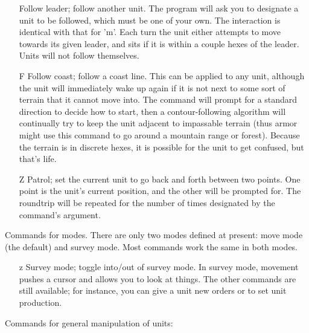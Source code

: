 \begin{itemize}
Follow leader; follow another unit.
The program will ask you to designate a unit to be followed, which must be
one of your own.  The interaction is identical with that for 'm'.
Each turn the unit either attempts to move
towards its given leader, and sits if it is within a couple hexes of
the leader.  Units will not follow themselves.
\item[{F}]
Follow coast; follow a coast line.  This can be applied to any unit, although
the unit will immediately wake up again if it is not next to some sort of
terrain that it cannot move into.
The command will prompt for a standard direction to decide how to start, then
a contour-following algorithm will continually try to keep the unit adjacent
to impassable terrain (thus armor might use this command to go around a
mountain range or forest).  Because the terrain is in discrete hexes,
it is possible for the unit to get confused, but that's life.
\item[{Z}]
Patrol; set the current unit to go back and forth between two points.
One point is the unit's current position, and the other will be prompted
for.  The roundtrip will be repeated for the number of times designated
by the command's argument.
\end{itemize}\par\noindent
Commands for modes.  There are only two modes defined at present:
move mode (the default) and survey mode.
Most commands work the same in both modes.
\begin{itemize}
\item[{z}]
Survey mode; toggle into/out of survey mode.  In survey mode, movement pushes a
cursor and allows you to look at things.  The other commands are still
available; for instance, you can 
give a unit new orders or to set unit production.
\end{itemize}\par\noindent
Commands for general manipulation of units:
